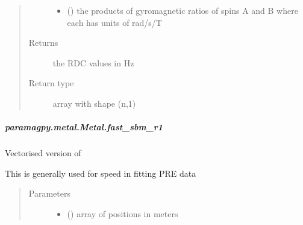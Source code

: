 \documentclass[a4paper,10pt,english]{sphinxmanual}
\begin{document}
\begin{fulllineitems}
\begin{fulllineitems}
\begin{fulllineitems}
\begin{quote}
\begin{description}
\begin{itemize}
\item {} 
 (\sphinxstyleliteralemphasis{\sphinxupquote{ (}}\sphinxstyleliteralemphasis{\sphinxupquote{,}}\sphinxstyleliteralemphasis{\sphinxupquote{)}}) \textendash{} the products of gyromagnetic ratios of spins A and B
where each has units of rad/s/T

\end{itemize}

\item[{Returns}] \leavevmode
{} \textendash{} the RDC values in Hz

\item[{Return type}] \leavevmode
array with shape (n,1)

\end{description}\end{quote}

\end{fulllineitems}



\subparagraph{paramagpy.metal.Metal.fast\_sbm\_r1}
\label{\detokenize{reference/generated/paramagpy.metal.Metal.fast_sbm_r1:paramagpy-metal-metal-fast-sbm-r1}}\label{\detokenize{reference/generated/paramagpy.metal.Metal.fast_sbm_r1::doc}}

\begin{fulllineitems}
\label{\detokenize{reference/generated/paramagpy.metal.Metal.fast_sbm_r1:paramagpy.metal.Metal.fast_sbm_r1}}
Vectorised version of {\hyperref[\detokenize{reference/generated/paramagpy.metal.Metal.sbm_r1:paramagpy.metal.Metal.sbm_r1}]{}}

This is generally used for speed in fitting PRE data
\begin{quote}\begin{description}
\item[{Parameters}] \leavevmode\begin{itemize}
\item {} 
 (\sphinxstyleliteralemphasis{\sphinxupquote{ (}}\sphinxstyleliteralemphasis{\sphinxupquote{,}}\sphinxstyleliteralemphasis{\sphinxupquote{)}}) \textendash{} array of positions in meters


\end{itemize}
\end{description}
\end{quote}
\end{fulllineitems}
\end{fulllineitems}
\end{fulllineitems}
\end{document}
